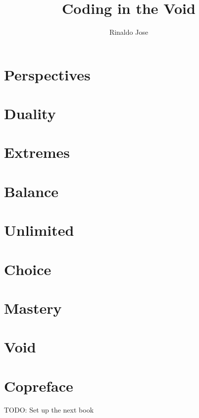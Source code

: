 \documentclass{book}
\title{Coding in the Void}
\author{Rinaldo Jose}
\begin{document}
\frontmatter

\maketitle
\tableofcontents



\mainmatter

\chapter{Perspectives}
\chapter{Duality}
\chapter{Extremes}
\chapter{Balance}
\chapter{Unlimited}
\chapter{Choice}
\chapter{Mastery}
\chapter{Void}


\backmatter
\chapter{Copreface}
TODO: Set up the next book
\end{document}
